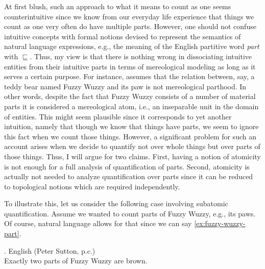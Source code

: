 	At first blush, such an approach to what it means to count as one seems counterintuitive since we know from our everyday life experience that things we count as one very often do have multiple parts. However, one should not confuse intuitive concepts with formal notions devised to represent the semantics of natural language expressions, e.g., the meaning of the English partitive word \textit{part} with $\sqsubseteq$. Thus, my view is that there is nothing wrong in dissociating intuitive entities from their intuitive parts in terms of mereological modeling as long as it serves a certain purpose. For instance, \citet{champollion2010parts,champollion2017parts} assumes that the relation between, say, a teddy bear named Fuzzy Wuzzy and its paw is not mereological parthood. In other words, despite the fact that Fuzzy Wuzzy consists of a number of material parts it is considered a mereological atom, i.e., an inseparable unit in the domain of entities. This might seem plausible since it corresponds to yet another intuition, namely that though we know that things have parts, we seem to ignore this fact when we count those things. However, a significant problem for such an account arises when we decide to quantify not over whole things but over parts of those things. Thus, I will argue for two claims. First, having a notion of atomicity is not enough for a full analysis of quantification of parts. Second, atomicity is actually not needed to analyze quantification over parts since it can be reduced to topological notions which are required independently.
	
	To illustrate this, let us consider the following case involving subatomic quantification. Assume we wanted to count parts of Fuzzy Wuzzy, e.g., its paws. Of course, natural language allows for that since we can say \ref{ex:fuzzy-wuzzy-part}.
	
	\ex. English (Peter Sutton, p.c.)\\
	Exactly two parts of Fuzzy Wuzzy are brown.\label{ex:fuzzy-wuzzy-part}

